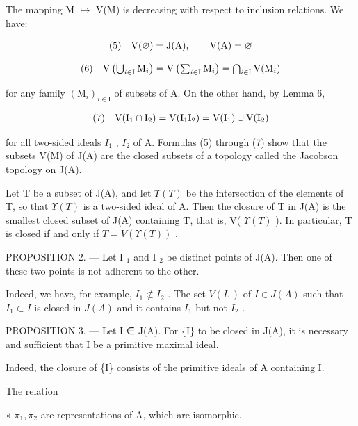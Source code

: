 The mapping M \(\mapsto\) V(M) is decreasing with respect to inclusion relations. We have:

\[
\begin{array}{r l} (5) & \mathrm{V} (\varnothing) = \mathrm{J} (\mathrm{A}), \qquad \mathrm{V} (\mathrm{A}) = \varnothing \end{array}
\]

\[
\begin{array}{r l} (6) & \mathrm{V} \left(\bigcup_ {i \in \mathrm{I}} \mathrm{M} _ {i}\right) = \mathrm{V} \left(\sum_ {i \in \mathrm{I}} \mathrm{M} _ {i}\right) = \bigcap_ {i \in \mathrm{I}} \mathrm{V} (\mathrm{M} _ {i}) \end{array}
\]

for any family \((\mathrm{M}_{i})_{i\in\mathrm{I}}\) of subsets of A. On the other hand, by Lemma 6,

\[
\begin{array}{r l} (7) & \mathrm{V} (\mathrm{I} _ {1} \cap \mathrm{I} _ {2}) = \mathrm{V} (\mathrm{I} _ {1} \mathrm{I} _ {2}) = \mathrm{V} (\mathrm{I} _ {1}) \cup \mathrm{V} (\mathrm{I} _ {2}) \end{array}
\]

for all two-sided ideals \(I_{1}\) , \(I_{2}\) of A. Formulas (5) through (7) show that the subsets V(M) of J(A) are the closed subsets of a topology called the Jacobson topology on J(A).

Let T be a subset of J(A), and let \(\Upsilon(T)\) be the intersection of the elements of T, so that \(\Upsilon(T)\) is a two-sided ideal of A. Then the closure of T in J(A) is the smallest closed subset of J(A) containing T, that is, V( \(\Upsilon(T)\) ). In particular, T is closed if and only if \(T = V(\Upsilon(T))\) .

PROPOSITION 2. --- Let I \(_{1}\) and I \(_{2}\) be distinct points of J(A). Then one of these two points is not adherent to the other.

Indeed, we have, for example, \(I_{1} \not\subset I_{2}\) . The set \(V(I_{1})\) of \(I \in J(A)\) such that \(I_{1} \subset I\) is closed in \(J(A)\) and it contains \(I_{1}\) but not \(I_{2}\) .

PROPOSITION 3. --- Let I ∈ J(A). For \{I\} to be closed in J(A), it is necessary and sufficient that I be a primitive maximal ideal.

Indeed, the closure of \{I\} consists of the primitive ideals of A containing I.

The relation

« \(\pi_{1},\pi_{2}\) are representations of A, which are isomorphic.

